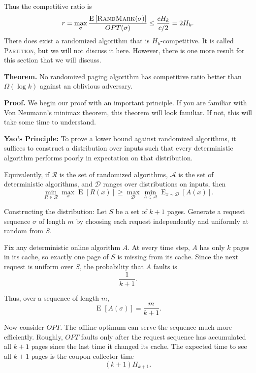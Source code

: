 \documentclass[14pt]{extreport}
\newcommand{\E}[2][]{\operatorname{E}_{#1}\left[#2\right]}
\begin{document}
    Thus the competitive ratio is
    $$r = \max_{\sigma} \frac{\E{\textsc{RandMark}(\sigma)}}{OPT(\sigma)}
    \le
    \frac{cH_k}{c/2}
    =
    2H_k.$$
    There does exist a randomized algorithm that is $H_k$-competitive. It is called \textsc{Partition}, but we will not discuss it here. However, there is one more result for this section that we will discuss.

    \vspace{5mm}
    \textbf{Theorem.} No randomized paging algorithm has competitive ratio better than $\Omega(\log k)$ against an oblivious adversary.

    \vspace{5mm}
    \textbf{Proof.}
    We begin our proof with an important principle. If you are familiar with Von Neumann's minimax theorem, this theorem will look familiar. If not, this will take some time to understand.

    \begin{tcolorbox}[colframe=gray!50, sharp corners]
        \textbf{Yao's Principle:} To prove a lower bound against randomized algorithms, it suffices to construct a distribution over inputs such that every deterministic algorithm performs poorly in expectation on that distribution.
    \end{tcolorbox}
    
    Equivalently, if $\mathcal{R}$ is the set of randomized algorithms, $\mathcal{A}$ is the set of deterministic algorithms, and $\mathcal{D}$ ranges over distributions on inputs, then
    $$\min_{R \in \mathcal{R}}\max_{x}\E{R(x)}
    \ge
    \max_{\mathcal{D}}\min_{A \in \mathcal{A}}\E[x \sim \mathcal{D}]{A(x)}.$$

    \vspace{5mm}
    Constructing the distribution: Let $S$ be a set of $k + 1$ pages. Generate a request sequence $\sigma$ of length $m$ by choosing each request independently and uniformly at random from $S$.

    \vspace{2mm}
    Fix any deterministic online algorithm $A$. At every time step, $A$ has only $k$ pages in its cache, so exactly one page of $S$ is missing from its cache. Since the next request is uniform over $S$, the probability that $A$ faults is
    $$\frac{1}{k+1}.$$

    \vspace{2mm}
    Thus, over a sequence of length $m$,
    $$\E{A(\sigma)} = \frac{m}{k+1}.$$

    Now consider $OPT$. The offline optimum can serve the sequence much more efficiently. Roughly, $OPT$ faults only after the request sequence has accumulated all $k+1$ pages since the last time it changed its cache. The expected time to see all $k+1$ pages is the coupon collector time
    $$(k+1)H_{k+1}.$$
\end{document}
